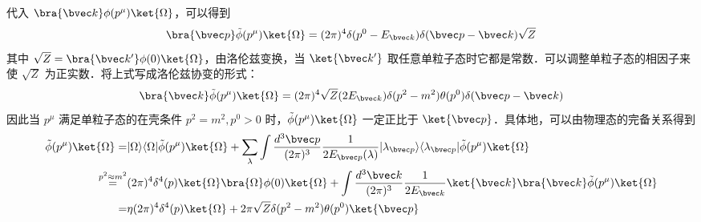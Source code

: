 代入 $\bra{\bvec k}\phi(p^\mu)\ket{\Omega}$，可以得到
\[
\bra{\bvec p}\tilde\phi(p^\mu)\ket{\Omega}=(2\pi)^4\delta(p^0-E_{\bvec k})\delta(\bvec p-\bvec k) \sqrt{Z}
\]
其中 $\sqrt{Z}=\bra{\bvec k'}\phi(0)\ket{\Omega}$，由洛伦兹变换，当 $\ket{\bvec k'}$ 取任意单粒子态时它都是常数．可以调整单粒子态的相因子来使 $\sqrt{Z}$ 为正实数．将上式写成洛伦兹协变的形式：
\[
\bra{\bvec k}\tilde\phi(p^\mu)\ket{\Omega}=(2\pi)^4 \sqrt{Z} (2E_{\bvec k})\delta(p^2-m^2)\theta(p^0) \delta(\bvec p-\bvec k)
\]
因此当 $p^\mu$ 满足单粒子态的在壳条件 $p^2=m^2,p^0>0$ 时，$\tilde \phi(p^\mu)\ket{\Omega}$ 一定正比于 $\ket{\bvec p}$．具体地，可以由物理态的完备关系得到
\begin{equation}\label{LSZ_eq3}\begin{aligned}
\tilde \phi(p^\mu)\ket{\Omega}=&|\Omega\rangle \langle \Omega|\tilde \phi(p^\mu)\ket{\Omega} + \sum_{\lambda}\int \frac{d^3  \bvec p}{(2\pi)^3}\frac{1}{2E_{\bvec p}(\lambda)}|\lambda_{\bvec p}\rangle \langle \lambda_{\bvec p}|\tilde \phi(p^\mu)\ket{\Omega}\\ \overset{p^2\approx m^2}{=}&(2\pi)^4 \delta^4(p)\ket{\Omega}\bra{\Omega}\phi(0)\ket{\Omega}
+
\int \frac{d^3 {\bvec k}}{(2\pi)^3}\frac{1}{2 E_{\bvec k}} \ket{\bvec k}\bra{\bvec k}\tilde \phi(p^\mu)\ket{\Omega}\\
=&\eta(2\pi)^4\delta^4(p)\ket{\Omega}+2\pi \sqrt{Z} \delta(p^2-m^2)\theta(p^0) \ket{\bvec p}
\end{aligned}\end{equation}

